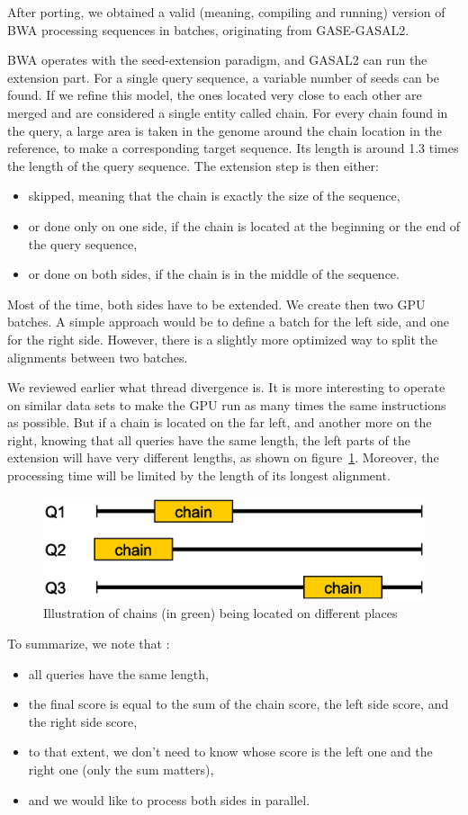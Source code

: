 After porting, we obtained a valid (meaning, compiling and running) version of BWA processing sequences in batches, originating from GASE-GASAL2.

BWA operates with the seed-extension paradigm, and GASAL2 can run the extension part. For a single query sequence, a variable number of seeds can be found. If we refine this model, the ones located very close to each other are merged and are considered a single entity called chain. For every chain found in the query, a large area is taken in the genome around the chain location in the reference, to make a corresponding target sequence. Its length is around 1.3 times the length of the query sequence. The extension step is then either:

\begin{itemize}
	\item skipped, meaning that the chain is exactly the size of the sequence,
	\item or done only on one side, if the chain is located at the beginning or the end of the query sequence,
	\item or done on both sides, if the chain is in the middle of the sequence.
\end{itemize}

Most of the time, both sides have to be extended. We create then two GPU batches. A simple approach would be to define a batch for the left side, and one for the right side. However, there is a slightly more optimized way to split the alignments between two batches.

We reviewed earlier what thread divergence is. It is more interesting to operate on similar data sets to make the GPU run as many times the same instructions as possible. But if a chain is located on the far left, and another more on the right, knowing that all queries have the same length, the left parts of the extension will have very different lengths, as shown on figure~\ref{fig:seds-different-chains}. Moreover, the processing time will be limited by the length of its longest alignment. 
\begin{figure}[h!]
	\centering
	\includegraphics[width=0.7\linewidth]{seds-different-chains}
	\caption{Illustration of chains (in green) being located on different places}
	\label{fig:seds-different-chains}
\end{figure}
To summarize, we note that :
\begin{itemize}
	\item all queries have the same length,
	\item the final score is equal to the sum of the chain score, the left side score, and the right side score,
	\item to that extent, we don't need to know whose score is the left one and the right one (only the sum matters),
	\item and we would like to process both sides in parallel.
\end{itemize}

